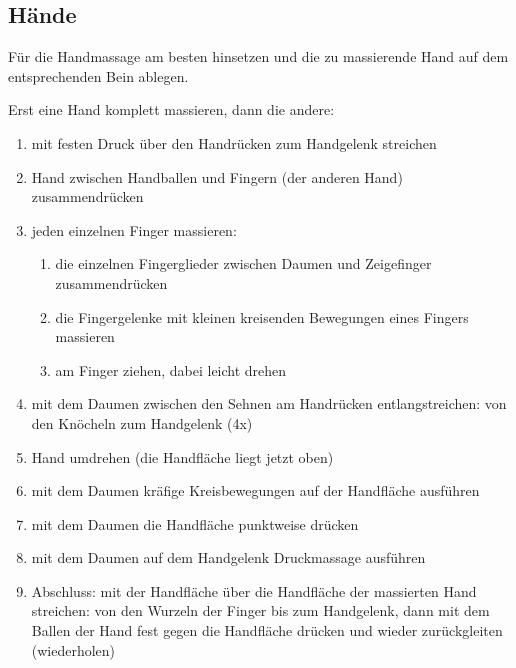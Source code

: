\subsection{Hände}
Für die Handmassage am besten hinsetzen und die zu massierende Hand auf dem entsprechenden Bein ablegen.

Erst eine Hand komplett massieren, dann die andere:
\begin{enumerate}
	\item mit festen Druck über den Handrücken zum Handgelenk streichen
	\item Hand zwischen Handballen und Fingern (der anderen Hand) zu\-sam\-men\-drü\-cken
	\item jeden einzelnen Finger massieren:
		\begin{enumerate}
			\item die einzelnen Fingerglieder zwischen Daumen und Zeigefinger zu\-sam\-men\-drü\-cken
			\item die Fingergelenke mit kleinen kreisenden Bewegungen eines Fingers massieren
			\item am Finger ziehen, dabei leicht drehen
		\end{enumerate}
	\item mit dem Daumen zwischen den Sehnen am Handrücken entlangstreichen: von den Knöcheln zum Handgelenk (4x)
	\item Hand umdrehen (die Handfläche liegt jetzt oben)
	\item mit dem Daumen kräfige Kreisbewegungen auf der Handfläche ausführen
	\item mit dem Daumen die Handfläche punktweise drücken
	\item mit dem Daumen auf dem Handgelenk Druckmassage ausführen
	\item Abschluss: mit der Handfläche über die Handfläche der massierten Hand streichen: von den Wurzeln der Finger bis zum Handgelenk, dann mit dem Ballen der Hand fest gegen die Handfläche drücken und wieder zurückgleiten (wiederholen)
\end{enumerate}